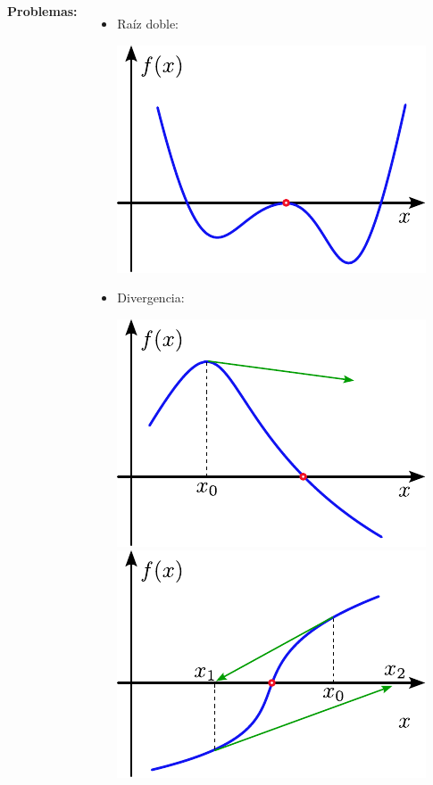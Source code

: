 \documentclass[9pt, aspectratio=169]{beamer}
\begin{document}
\begin{frame}[fragile]
  \begin{columns}[t]
    \cx
    \textbf{Problemas:}
    \begin{itemize}
      \item Raíz doble:
            \begin{center}
              \includegraphics[scale=0.5]{figs/problemas-01.pdf}
            \end{center}

      \item Divergencia:
            \begin{center}
              \includegraphics[scale=0.5]{figs/problemas-02.pdf}
              \includegraphics[scale=0.5]{figs/problemas-03.pdf}
            \end{center}
    \end{itemize}
    \pause


\end{columns}
\end{frame}
\end{document}
